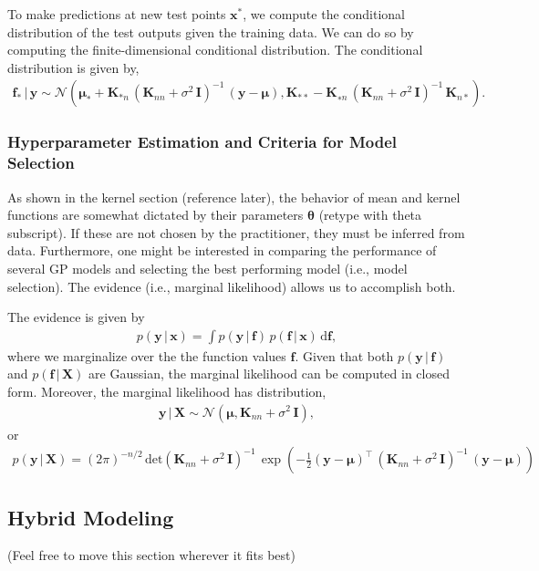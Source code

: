 \documentclass[journal=jacsat,manuscript=article]{achemso}
\newcommand{\kjtodo}[1]{{\color{red} (#1)}}
\newcommand{\alltodo}[1]{{\color{cyan} (#1)}}
\newcommand{\xvec}{\ensuremath{\mathbf{x}}}
\begin{document}
{To make predictions at new test points $\xvec^*$, we compute the conditional distribution of the test outputs given the training data. We can do so by computing the finite-dimensional conditional distribution. The conditional distribution is given by,
\begin{gather}
    \mathbf{f}_* \,|\, \mathbf{y} \sim \mathcal{N}(\boldsymbol{\mu}_* + \mathbf{K}_{*n}\,(\mathbf{K}_{nn} +\sigma^2\,\mathbf{I})^{-1}\,(\mathbf{y}-\boldsymbol{\mu}), \mathbf{K}_{**} - \mathbf{K}_{∗n} \,(\mathbf{K}_{nn}+\sigma^2\,\mathbf{I})^{-1}\,\mathbf{K}_{n*}).   
\end{gather}
\subsubsection{Hyperparameter Estimation and Criteria for Model Selection}
As shown in the kernel section \kjtodo{reference later}, the behavior of mean and kernel functions are somewhat dictated by their parameters $\boldsymbol{\theta}$ \kjtodo{retype with theta subscript}. If these are not chosen by the practitioner, they must be inferred from data. Furthermore, one might be interested in comparing the performance of several GP models and selecting the best performing model (i.e., model selection). The evidence (i.e., marginal likelihood) allows us to accomplish both.

The evidence is given by
\begin{gather}
    p(\mathbf{y}\, | \, \xvec) = \int p(\mathbf{y}\, | \, \mathbf{f}) \,  p(\mathbf{f}\, | \, \xvec) \, \text{d}\mathbf{f},
\end{gather}
where we marginalize over the the function values $\mathbf{f}$. Given that both $p(\mathbf{y}\, | \, \mathbf{f})$ and $ p(\mathbf{f}\, | \, \mathbf{X})$ are Gaussian, the marginal likelihood can be computed in closed form. Moreover, the marginal likelihood has distribution,
\begin{gather}
    \mathbf{y}\, | \, \mathbf{X} \sim \mathcal{N}(\boldsymbol{\mu}, \mathbf{K}_{nn} + \sigma^2 \,\mathbf{I}),
\end{gather}
or
\begin{gather}
    p(\mathbf{y}\, | \, \mathbf{X}) = (2\pi)^{-n/2}\,\text{det}(\mathbf{K}_{nn} + \sigma^2 \,\mathbf{I})^{-1}\,\exp \left( -\frac{1}{2}(\mathbf{y}-\boldsymbol{\mu})^\intercal \, (\mathbf{K}_{nn} + \sigma^2 \,\mathbf{I})^{-1}\,(\mathbf{y}-\boldsymbol{\mu})\right)
\end{gather}
}

\subsection{Hybrid Modeling}
\alltodo{Feel free to move this section wherever it fits best}\\
\end{document}
